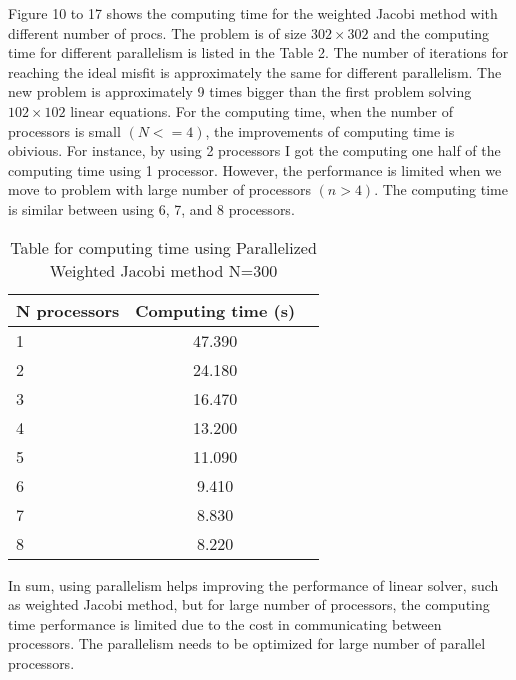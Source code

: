 \documentclass[12pt]{article}
\begin{document}
Figure 10 to 17 shows the computing time for the weighted Jacobi method with different number of procs. The problem is of size $302 \times 302$ and the computing time for different parallelism is listed in the Table 2. The number of iterations for reaching the ideal misfit is approximately the same for different parallelism. The new problem is approximately 9 times bigger than the first problem solving $102 \times 102$ linear equations. For the computing time, when the number of processors is small $(N<=4)$, the improvements of computing time is obivious. For instance, by using 2 processors I got the computing one half of the computing time using 1 processor. However, the performance is limited when we move to problem with large number of processors $(n>4)$. The computing time is similar between using 6, 7, and 8 processors.
\begin{table}[H]
	\centering
	\label{tab:cg}
	\begin{tabular}{lcr}
	\bfseries N {processors} & Computing time (s)\\ \hline
	1 & 47.390\\
	2 & 24.180\\
	3 & 16.470\\
	4 & 13.200\\
	5 & 11.090\\
	6 & 9.410\\
	7 & 8.830\\
	8 & 8.220\\
	\end{tabular}
	\caption[This is optional caption, without reference]{Table for computing time using Parallelized Weighted Jacobi method N=300}
\end{table}

In sum, using parallelism helps improving the performance of linear solver, such as weighted Jacobi method, but for large number of processors, the computing time performance is limited due to the cost in communicating between processors. The parallelism needs to be optimized for large number of parallel processors.

%
%
%
\end{document}
